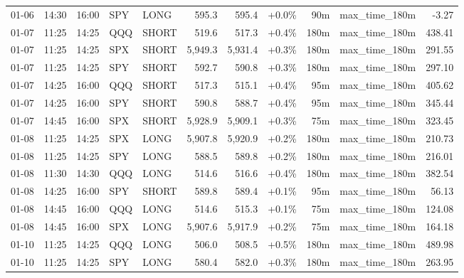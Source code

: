\documentclass[11pt,a4paper,twoside]{article}
\begin{document}
\begin{center}
\begin{longtable}{>{\color{txtmain}}l l l l l r r r r >{\color{txtmain}}l r}
01-06 & 14:30 & 16:00 & SPY & LONG & 595.3 & 595.4 & \textcolor{wingreen}{+0.0\%} & 90m & max\_time\_180m & \textcolor{lossred}{-3.27} \\
01-07 & 11:25 & 14:25 & QQQ & SHORT & 519.6 & 517.3 & \textcolor{wingreen}{+0.4\%} & 180m & max\_time\_180m & \textcolor{wingreen}{438.41} \\
01-07 & 11:25 & 14:25 & SPX & SHORT & 5,949.3 & 5,931.4 & \textcolor{wingreen}{+0.3\%} & 180m & max\_time\_180m & \textcolor{wingreen}{291.55} \\
01-07 & 11:25 & 14:25 & SPY & SHORT & 592.7 & 590.8 & \textcolor{wingreen}{+0.3\%} & 180m & max\_time\_180m & \textcolor{wingreen}{297.10} \\
01-07 & 14:25 & 16:00 & QQQ & SHORT & 517.3 & 515.1 & \textcolor{wingreen}{+0.4\%} & 95m & max\_time\_180m & \textcolor{wingreen}{405.62} \\
01-07 & 14:25 & 16:00 & SPY & SHORT & 590.8 & 588.7 & \textcolor{wingreen}{+0.4\%} & 95m & max\_time\_180m & \textcolor{wingreen}{345.44} \\
01-07 & 14:45 & 16:00 & SPX & SHORT & 5,928.9 & 5,909.1 & \textcolor{wingreen}{+0.3\%} & 75m & max\_time\_180m & \textcolor{wingreen}{323.45} \\
01-08 & 11:25 & 14:25 & SPX & LONG & 5,907.8 & 5,920.9 & \textcolor{wingreen}{+0.2\%} & 180m & max\_time\_180m & \textcolor{wingreen}{210.73} \\
01-08 & 11:25 & 14:25 & SPY & LONG & 588.5 & 589.8 & \textcolor{wingreen}{+0.2\%} & 180m & max\_time\_180m & \textcolor{wingreen}{216.01} \\
01-08 & 11:30 & 14:30 & QQQ & LONG & 514.6 & 516.6 & \textcolor{wingreen}{+0.4\%} & 180m & max\_time\_180m & \textcolor{wingreen}{382.54} \\
01-08 & 14:25 & 16:00 & SPY & SHORT & 589.8 & 589.4 & \textcolor{wingreen}{+0.1\%} & 95m & max\_time\_180m & \textcolor{wingreen}{56.13} \\
01-08 & 14:45 & 16:00 & QQQ & LONG & 514.6 & 515.3 & \textcolor{wingreen}{+0.1\%} & 75m & max\_time\_180m & \textcolor{wingreen}{124.08} \\
01-08 & 14:45 & 16:00 & SPX & LONG & 5,907.6 & 5,917.9 & \textcolor{wingreen}{+0.2\%} & 75m & max\_time\_180m & \textcolor{wingreen}{164.18} \\
01-10 & 11:25 & 14:25 & QQQ & LONG & 506.0 & 508.5 & \textcolor{wingreen}{+0.5\%} & 180m & max\_time\_180m & \textcolor{wingreen}{489.98} \\
01-10 & 11:25 & 14:25 & SPY & LONG & 580.4 & 582.0 & \textcolor{wingreen}{+0.3\%} & 180m & max\_time\_180m & \textcolor{wingreen}{263.95} \\

\end{longtable}
\end{center}
\end{document}
